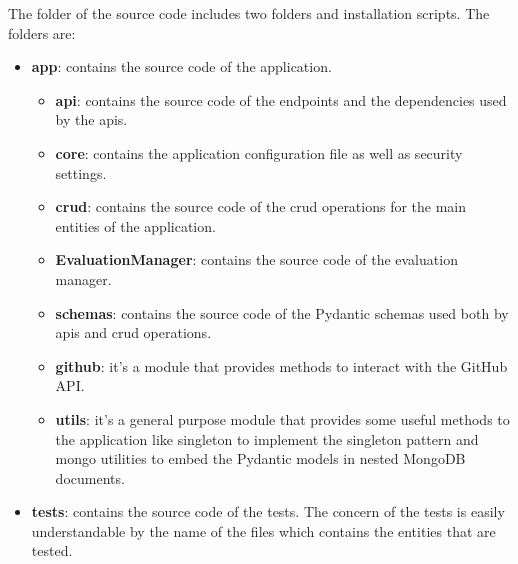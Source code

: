 The folder of the source code includes two folders and installation scripts. The folders are:
\begin{itemize}
        \item \textbf{app}: contains the source code of the application.
        \begin{itemize}
            \item \textbf{api}: contains the source code of the endpoints and the dependencies used by the apis.
            \item \textbf{core}: contains the application configuration file as well as security settings.
            \item \textbf{crud}: contains the source code of the crud operations for the main entities of the application.
            \item \textbf{EvaluationManager}: contains the source code of the evaluation manager.
            \item \textbf{schemas}: contains the source code of the Pydantic schemas used both by apis and crud operations.
            \item \textbf{github}: it's a module that provides methods to interact with the GitHub API.
            \item \textbf{utils}: it's a general purpose module that provides some useful methods to the application like singleton to implement the singleton pattern and mongo utilities to embed the Pydantic models in nested MongoDB documents.
        \end{itemize}
        \item \textbf{tests}: contains the source code of the tests. The concern of the tests is easily understandable by the name of the files which contains the entities that are tested.
\end{itemize}